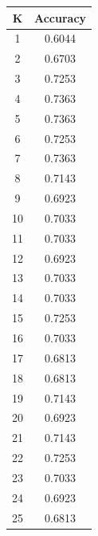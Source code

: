 \documentclass{classrep}
\begin{document}
{{{                \begin{table}[!htbp]
                    \begin{minipage}{.35\textwidth}
                        \centering
                        \begin{tabular}{|c|c|}
                            \hline
                            K & Accuracy \\ \hline
                            1 & 0.6044 \\ \hline
                            2 & 0.6703 \\ \hline
                            3 & 0.7253 \\ \hline
                            4 & 0.7363 \\ \hline
                            5 & 0.7363 \\ \hline
                            6 & 0.7253 \\ \hline
                            7 & 0.7363 \\ \hline
                            8 & 0.7143 \\ \hline
                            9 & 0.6923 \\ \hline
                            10 & 0.7033 \\ \hline
                            11 & 0.7033 \\ \hline
                            12 & 0.6923 \\ \hline
                            13 & 0.7033 \\ \hline
                            14 & 0.7033 \\ \hline
                            15 & 0.7253 \\ \hline
                            16 & 0.7033 \\ \hline
                            17 & 0.6813 \\ \hline
                            18 & 0.6813 \\ \hline
                            19 & 0.7143 \\ \hline
                            20 & 0.6923 \\ \hline
                            21 & 0.7143 \\ \hline
                            22 & 0.7253 \\ \hline
                            23 & 0.7033 \\ \hline
                            24 & 0.6923 \\ \hline
                            25 & 0.6813 \\ \hline

\end{tabular}
\end{minipage}
\end{table}}}}
\end{document}
